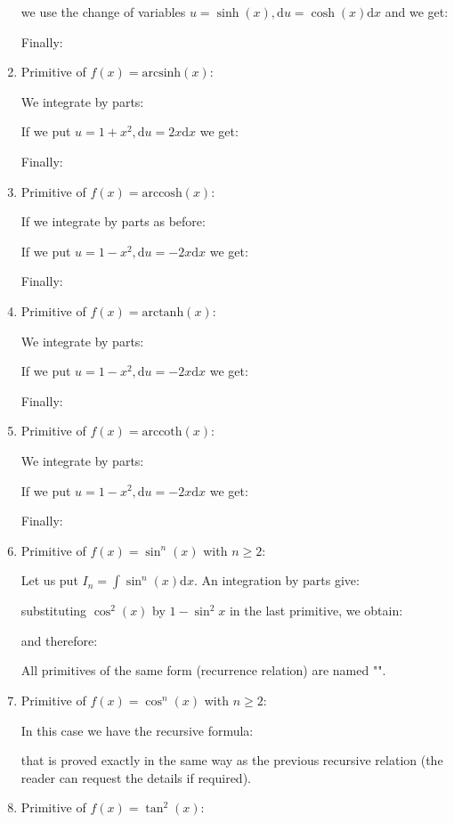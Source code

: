 \begin{enumerate}
		we use the change of variables $u=\sinh(x),\mathrm{d}u=\cosh(x)\mathrm{d}x$ and we get:
		
		Finally:
		
		\item Primitive of $f(x)=\text{arcsinh}(x)$:
		
		We integrate by parts:
		
		If we put $u=1+x^2,\mathrm{d}u=2x\mathrm{d}x$ we get:
		
		Finally:
		
		\item Primitive of $f(x)=\text{arccosh}(x)$:
		
		If we integrate by parts as before:
		
		If we put $u=1-x^2,\mathrm{d}u=-2x\mathrm{d}x$ we get:
		
		Finally:
		
		\item Primitive of $f(x)=\text{arctanh}(x)$:
		
		We integrate by parts:
		
		If we put $u=1-x^2,\mathrm{d}u=-2x\mathrm{d}x$ we get:
		
		Finally:
		
		\item Primitive of $f(x)=\text{arccoth}(x)$:
		
		We integrate by parts:
		
		If we put $u=1-x^2,\mathrm{d}u=-2x\mathrm{d}x$ we get:
		
		Finally:
		
		\item Primitive of $f(x)=\sin ^{n}(x)$ with $n \geq 2$:
		
		Let us put $I_n=\int \sin ^n(x)\mathrm{d}x$. An integration by parts give:
		
		substituting $\cos ^2(x)$ by $1-\sin ^2{x}$ in the last primitive, we obtain:
		
		and therefore:
		
		All primitives of the same form (recurrence relation) are named "".
		
		\item Primitive of $f(x)=\cos ^{n}(x)$ with $n \geq 2$:
		
		In this case we have the recursive formula:
		
		that is proved exactly in the same way as the previous recursive relation (the reader can request the details if required).
		\item Primitive of $f(x)=\tan ^{2}(x)$:
		

\end{enumerate}
